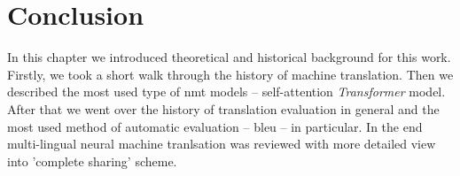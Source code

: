\section{Conclusion}

In this chapter we introduced theoretical and historical background for this work.
Firstly, we took a short walk through the history of machine translation.
Then we described the most used type of \acrshort{nmt} models --
self-attention \textit{Transformer} model.
After that we went over the history of translation evaluation in general and the most
used method of automatic evaluation -- \acrshort{bleu} -- in particular.
In the end multi-lingual neural machine tranlsation was reviewed
with more detailed view into 'complete sharing' scheme.

